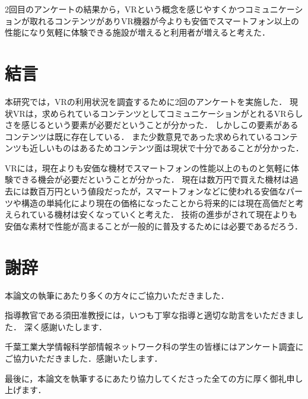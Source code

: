 \documentclass[12pt,a4j]{ltjsarticle}
\begin{document}
2回目のアンケートの結果から，VRという概念を感じやすくかつコミュニケーションが取れるコンテンツがありVR機器が今よりも安価でスマートフォン以上の性能になり気軽に体験できる施設が増えると利用者が増えると考えた．

\clearpage

\section{結言}
本研究では，VRの利用状況を調査するために2回のアンケートを実施した．
現状VRは，求められているコンテンツとしてコミュニケーションがとれるVRらしさを感じるという要素が必要だということが分かった．
しかしこの要素があるコンテンツは既に存在している．
また少数意見であった求められているコンテンツも近しいものはあるためコンテンツ面は現状で十分であることが分かった．

VRには，現在よりも安価な機材でスマートフォンの性能以上のものと気軽に体験できる機会が必要だということが分かった．
現在は数万円で買えた機材は過去には数百万円という値段だったが，スマートフォンなどに使われる安価なパーツや構造の単純化により現在の価格になったことから将来的には現在高価だと考えられている機材は安くなっていくと考えた\cite{VR機材が安価になった理由}．
技術の進歩がされて現在よりも安価な素材で性能が高まることが一般的に普及するためには必要であるだろう．

\clearpage

\section{謝辞}
本論文の執筆にあたり多くの方々にご協力いただきました．

指導教官である須田准教授には，いつも丁寧な指導と適切な助言をいただきました．
深く感謝いたします．

千葉工業大学情報科学部情報ネットワーク科の学生の皆様にはアンケート調査にご協力いただきました．感謝いたします．

最後に，本論文を執筆するにあたり協力してくださった全ての方に厚く御礼申し上げます．
\end{document}
